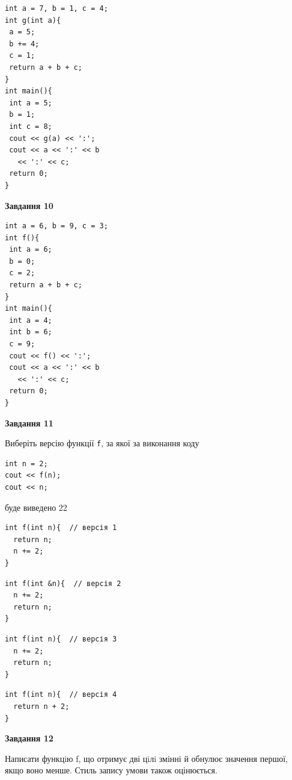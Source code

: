 \documentclass[12pt, ukrainian]{article}
\def\code#1{\Verb!#1!}
\begin{document}
{\begin {large}
\begin{minipage}[t]{7.0cm}
\begin{verbatim}
int a = 7, b = 1, c = 4;
int g(int a){
 a = 5;
 b += 4;
 c = 1;
 return a + b + c;
}
int main(){
 int a = 5;
 b = 1;
 int c = 8;
 cout << g(a) << ':';
 cout << a << ':' << b 
   << ':' << c;
 return 0;
}
\end{verbatim}



\begin{center}
\textbf{Завдання 10}
\end{center}
\vspace{-8mm}

\begin{verbatim}
int a = 6, b = 9, c = 3;
int f(){
 int a = 6;
 b = 0;
 c = 2;
 return a + b + c;
}
int main(){
 int a = 4;
 int b = 6;
 c = 9;
 cout << f() << ':';
 cout << a << ':' << b 
   << ':' << c;
 return 0;
}
\end{verbatim}

\end{minipage}
\vline \hspace{1mm}
\begin{minipage}[t]{11.0cm}

\begin{center}
\textbf{Завдання 11}
\end{center}
Виберіть версію функції \code{f}, за якої за виконання коду
\begin{verbatim}
int n = 2;
cout << f(n);
cout << n;
\end{verbatim}

буде виведено 22

\begin{verbatim}
int f(int n){  // версія 1
  return n;
  n += 2;
}
\end{verbatim}

\vspace{-8mm}\begin{verbatim}
int f(int &n){  // версія 2
  n += 2;
  return n;
}
\end{verbatim}

\vspace{-8mm}\begin{verbatim}
int f(int n){  // версія 3
  n += 2;
  return n;
}
\end{verbatim}

\vspace{-8mm}\begin{verbatim}
int f(int n){  // версія 4
  return n + 2;
}
\end{verbatim}



\begin{center}
\textbf{Завдання 12}
\end{center}

Написати функцiю f, що отримує дві цiлi змінні й обнулює значення першої, якщо воно менше. Стиль запису умови також оцінюється.\par

\end{minipage}

\end {large}}
\newpage
\end{document}
